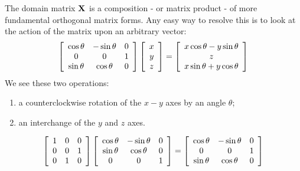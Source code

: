 The domain matrix $\X{}$ is a composition - or matrix product - of more fundamental orthogonal matrix forms. Any easy way to resolve this is to look at the action of the matrix upon an arbitrary vector:
\begin{equation}
 \mat{ccc}
{                
\cos\theta & -\sin\theta & 0 \\
0 & 0 & 1 \\
\sin\theta & \cos\theta & 0
} 
\mat{c}
{x\\y\\z}
=
\mat{c}
{x\cos\theta-y\sin\theta \\ z \\ x\sin\theta+y\cos\theta}
\end{equation}
We see these two operations:
\begin{enumerate}
\item a counterclockwise rotation of the $x-y$ axes by an angle $\theta$;
\item an interchange of the $y$ and $z$ axes.
\end{enumerate}
\begin{equation}
  \mat{ccc}
  {1&0&0\\
   0&0&1\\
   0&1&0}
  \mat{ccc}
  {\cos\theta & -\sin\theta & 0\\
   \sin\theta &  \cos\theta & 0\\
        0     &       0     & 1}
   =
\mat{ccc}
{                
\cos\theta & -\sin\theta & 0 \\
0 & 0 & 1 \\
\sin\theta & \cos\theta & 0
}
\end{equation}


